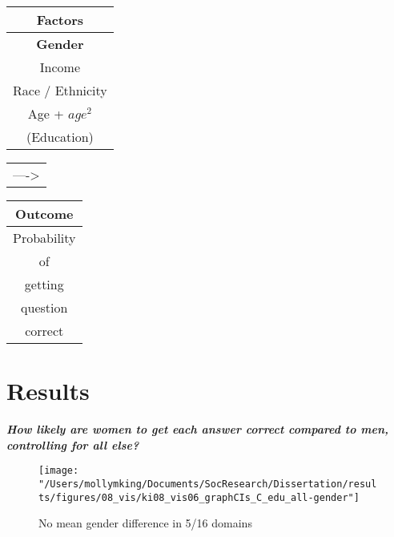 \documentclass[]{article}
\begin{document}
 \begin{table}[ht]
 \centering
     \begin{tabular}{c}  %
       \hline   %
       Factors          \\
       \hline   %
       \textbf{Gender}           \\
       Income           \\
       Race / Ethnicity \\
       Age + $age^2$    \\
       (Education)        \\
       \hline  %
     \end{tabular}
     \begin{tabular}{l}  %
       ---->
     \end{tabular}
     \begin{tabular}{c}  %
        \hline   %
        Outcome        \\
        \hline   %
        Probability      \\
        of     \\
        getting \\
        question     \\
        correct          \\
        \hline  %
      \end{tabular}
 \end{table}



\newpage
\section{Results}\label{Results}

\emph{\textbf{How likely are women to get each answer correct compared to men, controlling for all else?}}
\begin{figure}[ht]
    \begin{center}
      \texttt{[image: "/Users/mollymking/Documents/SocResearch/Dissertation/results/figures/08\_vis/ki08\_vis06\_graphCIs\_C\_edu\_all-gender"]}
      \caption{No mean gender difference in 5/16 domains}
    \end{center}
\end{figure}
\end{document}
